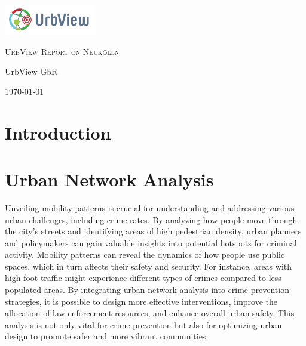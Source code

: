 \documentclass[runningheads]{llncs}
\begin{document}
\begin{titlepage}
	\centering
	\includegraphics[width=0.3\textwidth]{./figures/intro_rishabh/Urbview_logo_left_colored.png}\par\vspace{1cm}
	{\selectfont %
		\scshape\Huge UrbView Report on Neukölln \par}
	\vspace{2cm}
	{\selectfont %
		\Large UrbView GbR \par}
	\vfill
	{\large \today\par}
\end{titlepage}

\section{Introduction}


\section{Urban Network Analysis}

Unveiling mobility patterns is crucial for understanding and addressing various urban challenges, including crime rates. By analyzing how people move through the city's streets and identifying areas of high pedestrian density, urban planners and policymakers can gain valuable insights into potential hotspots for criminal activity. Mobility patterns can reveal the dynamics of how people use public spaces, which in turn affects their safety and security. For instance, areas with high foot traffic might experience different types of crimes compared to less populated areas. By integrating urban network analysis into crime prevention strategies, it is possible to design more effective interventions, improve the allocation of law enforcement resources, and enhance overall urban safety. This analysis is not only vital for crime prevention but also for optimizing urban design to promote safer and more vibrant communities.
\end{document}
